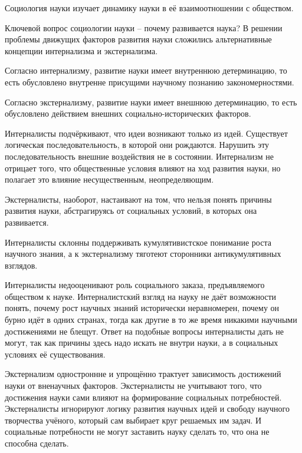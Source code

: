 \documentclass[exam_answers.tex]{subfiles}
\begin{document}
\renewcommand{\baselinestretch}{\blch}

Социология науки изучает динамику науки в её взаимоотношении с обществом.

Ключевой вопрос социологии науки – почему развивается наука?
В решении проблемы движущих факторов развития науки сложились альтернативные концепции интернализма и экстернализма.

Согласно интернализму, развитие науки имеет внутреннюю детерминацию, то есть обусловлено внутренне присущими научному познанию закономерностями.

Согласно экстернализму, развитие науки имеет внешнюю детерминацию, то есть обусловлено действием внешних социально-исторических факторов.

Интерналисты подчёркивают, что идеи возникают только из идей.
Существует логическая последовательность, в которой они рождаются. Нарушить эту последовательность внешние воздействия не в состоянии.
Интернализм не отрицает того, что общественные условия влияют на ход развития науки, но полагает это влияние несущественным, неопределяющим.

Экстерналисты, наоборот, настаивают на том, что нельзя понять причины развития науки, абстрагируясь от социальных условий, в которых она развивается.

Интерналисты склонны поддерживать кумулятивистское понимание роста научного знания, а к экстернализму тяготеют сторонники антикумулятивных взглядов.

Интерналисты недооценивают роль социального заказа, предъявляемого обществом к науке. Интерналистский взгляд на науку не даёт возможности понять, почему рост научных знаний исторически неравномерен, почему он бурно идёт в одних странах, тогда как другие в то же время никакими научными достижениями не блещут.
Ответ на подобные вопросы интерналисты дать не могут, так как причины здесь надо искать не внутри науки, а в социальных условиях её существования.

Экстернализм одностроннне и упрощённо трактует зависимость достижений науки от вненаучных факторов.
Экстерналисты не учитывают того, что достижения науки сами влияют на формирование социальных потребностей.
Экстерналисты игнорируют логику развития научных идей и свободу научного творчества учёного, который сам выбирает круг решаемых им задач.
И социальные потребности не могут заставить науку сделать то, что она не способна сделать.
\end{document}
